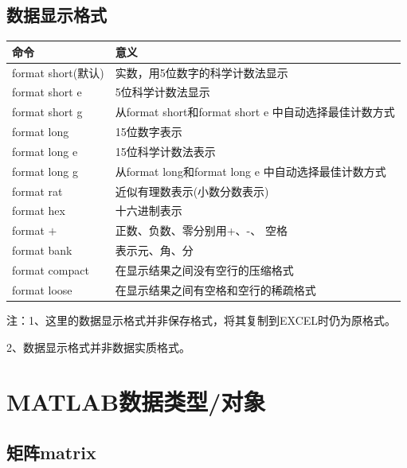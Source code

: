     \subsection{数据显示格式}
        \begin{table}[H]
        \centering
        \begin{tabular}{ll}%
            \toprule
            命令 & 意义\\
            \midrule
        format short(默认)  &实数，用5位数字的科学计数法显示\\
        format short e  &5位科学计数法显示\\
        format short g  &从format short和format short e 中自动选择最佳计数方式\\
        format long &15位数字表示\\
        format long e &15位科学计数法表示\\
        format long g &从format long和format long e 中自动选择最佳计数方式\\
        format rat  &近似有理数表示(小数分数表示)\\
        format hex  &十六进制表示\\
        format $+$  &正数、负数、零分别用+、-、 空格\\
        format bank&  表示元、角、分\\
        format compact  &在显示结果之间没有空行的压缩格式\\
        format loose  &在显示结果之间有空格和空行的稀疏格式\\
        \bottomrule
        \end{tabular}
        \end{table}
        \noindent
        注：1、这里的数据显示格式并非保存格式，将其复制到EXCEL时仍为原格式。
        \par
         2、数据显示格式并非数据实质格式。

\section{MATLAB数据类型/对象}
    \subsection{矩阵matrix}
